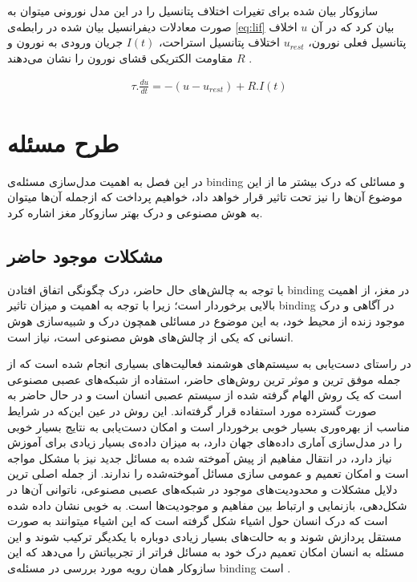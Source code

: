 \documentclass[12pt]{report}
\begin{document}
	ساز‌وکار بیان شده برای تغیرات اختلاف پتانسیل را در این مدل نورونی میتوان به صورت معادلات دیفرانسیل بیان شده در رابطه‌ی \ref{eq:lif} بیان کرد که در آن $u$ اخلاف پتانسیل فعلی نورون، $u_{rest}$ اختلاف پتانسیل استراحت، $I(t)$ جریان ورودی به نورون و $R$ مقاومت الکتریکی قشای نورون را نشان می‌دهند
	\cite{gerstner2014neuronal}.
	
	\begin{align}
		\tau . \frac{du}{dt} = -(u - u_{rest}) + R . I(t) 
		\label{eq:lif}
	\end{align}
	
	
	\chapter{طرح مسئله}
	
	در این فصل به اهمیت مدل‌سازی مسئله‌ی \gls{binding} و مسائلی که درک بیشتر ما از این موضوع آن‌ها را نیز تحت تاثیر قرار خواهد داد، خواهیم پرداخت که از‌جمله آن‌ها میتوان به هوش مصنوعی و درک بهتر ساز‌وکار مغز اشاره کرد.
	
	\section{مشکلات موجود حاضر}
	
	با توجه به چالش‌های حال حاضر، درک چگونگی اتفاق افتادن \gls{binding} در مغز، از اهمیت بالایی برخوردار است؛ زیرا با توجه به اهمیت و میزان تاثیر \gls{binding} در آگاهی و درک موجود زنده از محیط خود، به این موضوع در مسائلی همچون درک و شبیه‌سازی هوش انسانی که یکی از چالش‌های هوش مصنوعی است، نیاز است.
	
	در راستای دست‌یابی به سیستم‌های هوشمند فعالیت‌های بسیاری انجام شده است که از جمله‌ موفق ترین و موثر ترین روش‌های حاضر، استفاده از شبکه‌های عصبی مصنوعی است که یک روش الهام گرفته شده از سیستم عصبی انسان است و در حال حاضر به صورت گسترده مورد استفاده قرار گرفته‌اند. این روش در  عین این‌که در شرایط مناسب از بهره‌وری بسیار خوبی برخوردار است و امکان دست‌یابی به نتایج بسیار خوبی را در مدل‌سازی آماری داده‌های جهان دارد، به میزان داده‌ی بسیار زیادی برای آموزش نیاز دارد، در انتقال مفاهیم از پیش آموخته شده به مسائل جدید نیز با مشکل مواجه است و امکان تعمیم و عمومی سازی مسائل آموخته‌شده را ندارند.
	از جمله اصلی ترین دلایل مشکلات و محدودیت‌های موجود در شبکه‌های عصبی مصنوعی، ناتوانی آن‌ها در شکل‌دهی، بازنمایی و ارتباط بین مفاهیم و موجودیت‌ها است. به خوبی نشان داده شده است که درک انسان حول اشیاء شکل گرفته است که این اشیاء میتوانند به صورت مستقل پردازش شوند و به حالت‌های بسیار زیادی دوباره با یکدیگر ترکیب شوند و این مسئله به انسان امکان تعمیم درک خود به مسائل فراتر از تجربیاتش را می‌دهد که این ساز‌وکار همان رویه مورد بررسی در مسئله‌ی \gls{binding} است
	\cite{greff2020binding}.
	
\end{document}
